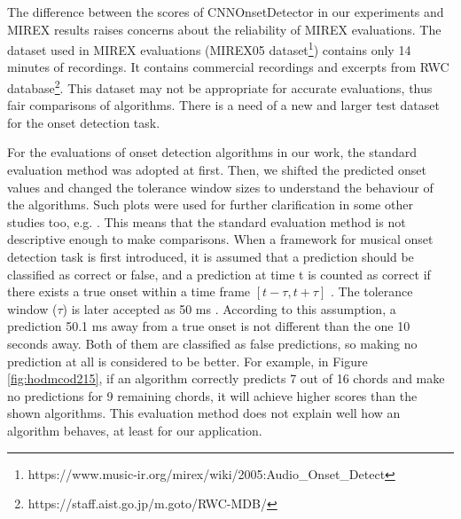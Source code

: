 The difference between the scores of CNNOnsetDetector in our experiments and MIREX results raises concerns about the reliability of MIREX evaluations. The dataset used in MIREX evaluations (MIREX05 dataset\footnote{https://www.music-ir.org/mirex/wiki/2005:Audio\_Onset\_Detect}) contains only 14 minutes of recordings. It contains commercial recordings and excerpts from RWC database\footnote{https://staff.aist.go.jp/m.goto/RWC-MDB/}. This dataset may not be appropriate for accurate evaluations, thus fair comparisons of algorithms. There is a need of a new and larger test dataset for the onset detection task.

For the evaluations of onset detection algorithms in our work, the standard evaluation method was adopted at first. Then, we shifted the predicted onset values and changed the tolerance window sizes to understand the behaviour of the algorithms. Such plots were used for further clarification in some other studies too, e.g. \cite{holzapfel2009three}. This means that the standard evaluation method is not descriptive enough to make comparisons. When a framework for musical onset detection task is first introduced, it is assumed that a prediction should be classified as correct or false, and a prediction at time t is counted as correct if there exists a true onset within a time frame \([t - \tau, t + \tau]\) \cite{leveau2004}. The tolerance window (\(\tau\)) is later accepted as 50 ms \cite{bello2005tutorial}. According to this assumption, a prediction 50.1 ms away from a true onset is not different than the one 10 seconds away. Both of them are classified as false predictions, so making no prediction at all is considered to be better. For example, in Figure \ref{fig:hodmcod215}, if an algorithm correctly predicts 7 out of 16 chords and make no predictions for 9 remaining chords, it will achieve higher scores than the shown algorithms. This evaluation method does not explain well how an algorithm behaves, at least for our application. 

